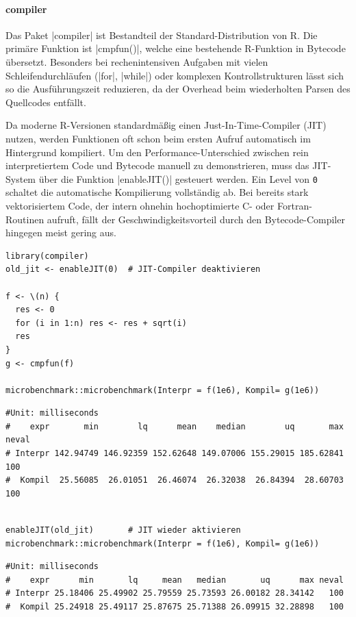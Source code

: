 \documentclass[10pt,twocolumn]{scrartcl}
\renewcommand{\lstinline}{\mycoloredinline}
\begin{document}
\paragraph{compiler}

Das Paket \lstinline|compiler| ist Bestandteil der Standard-Distribution von R. Die primäre Funktion ist \lstinline|cmpfun()|, welche eine bestehende R-Funktion in Bytecode übersetzt. Besonders bei rechenintensiven Aufgaben mit vielen Schleifendurchläufen (\lstinline|for|, \lstinline|while|) oder komplexen Kontrollstrukturen lässt sich so die Ausführungszeit reduzieren, da der Overhead beim wiederholten Parsen des Quellcodes entfällt.

Da moderne R-Versionen standardmäßig einen Just-In-Time-Compiler (JIT) nutzen, werden Funktionen oft schon beim ersten Aufruf automatisch im Hintergrund kompiliert. Um den Performance-Unterschied zwischen rein interpretiertem Code und Bytecode manuell zu demonstrieren, muss das JIT-System über die Funktion \lstinline|enableJIT()| gesteuert werden. Ein Level von \texttt{0} schaltet die automatische Kompilierung vollständig ab. Bei bereits stark vektorisiertem Code, der intern ohnehin hochoptimierte C- oder Fortran-Routinen aufruft, fällt der Geschwindigkeitsvorteil durch den Bytecode-Compiler hingegen meist gering aus.

\begin{lstlisting}
library(compiler)
old_jit <- enableJIT(0)  # JIT-Compiler deaktivieren

f <- \(n) {
  res <- 0
  for (i in 1:n) res <- res + sqrt(i)
  res
}
g <- cmpfun(f)

microbenchmark::microbenchmark(Interpr = f(1e6), Kompil= g(1e6))
\end{lstlisting}
\begin{lstlisting}[aboveskip=-2pt,basicstyle=\fontsize{8.4pt}{8.7pt}\selectfont\ttfamily]
#Unit: milliseconds
#    expr       min        lq      mean    median        uq       max neval
# Interpr 142.94749 146.92359 152.62648 149.07006 155.29015 185.62841   100
#  Kompil  25.56085  26.01051  26.46074  26.32038  26.84394  28.60703   100
\end{lstlisting}
\begin{lstlisting}[aboveskip=-2pt]

enableJIT(old_jit)       # JIT wieder aktivieren
microbenchmark::microbenchmark(Interpr = f(1e6), Kompil= g(1e6))
\end{lstlisting}
\begin{lstlisting}[aboveskip=-2pt,basicstyle=\fontsize{9.3pt}{9.6pt}\selectfont\ttfamily]
#Unit: milliseconds
#    expr      min       lq     mean   median       uq      max neval
# Interpr 25.18406 25.49902 25.79559 25.73593 26.00182 28.34142   100
#  Kompil 25.24918 25.49117 25.87675 25.71388 26.09915 32.28898   100
\end{lstlisting}
\end{document}

